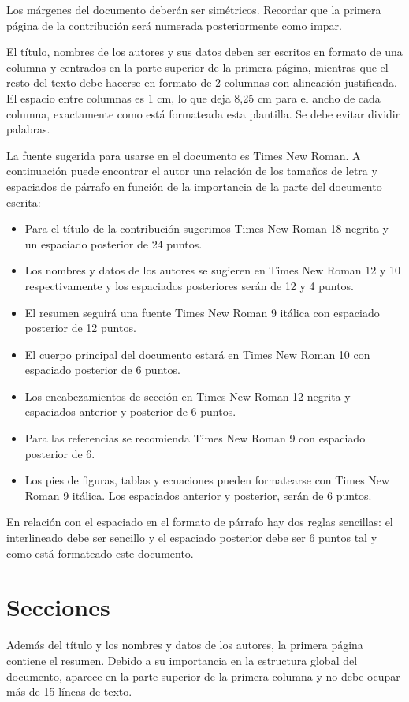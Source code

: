 \documentclass[a4paper,10pt,twocolumn]{article}
\begin{document}
Los márgenes del documento deberán ser simétricos. Recordar que la primera página de la contribución será numerada posteriormente como impar.

El título, nombres de los autores y sus datos deben ser escritos en formato de una columna y centrados en la parte superior de la primera página, mientras que el resto del texto debe hacerse en formato de 2 columnas con alineación justificada. El espacio entre columnas es 1 cm, lo que deja 8,25 cm para el ancho de cada columna, exactamente como está formateada esta plantilla. Se debe evitar dividir palabras.

La fuente sugerida para usarse en el documento es Times New Roman. A continuación puede encontrar el autor una relación de los tamaños de letra y espaciados de párrafo en función de la importancia de la parte del documento escrita:
\begin{itemize}[topsep=0pt, partopsep=0pt, parsep=0pt]
\item Para el título de la contribución sugerimos Times New Roman 18 negrita y un espaciado posterior de 24 puntos.
\item Los nombres y datos de los autores se sugieren en Times New Roman 12 y 10 respectivamente y los espaciados posteriores serán de 12 y 4 puntos.
\item El resumen seguirá una fuente Times New Roman 9 itálica con espaciado posterior de 12 puntos.
\item El cuerpo principal del documento estará en Times New Roman 10 con espaciado posterior de 6 puntos.
\item Los encabezamientos de sección en Times New Roman 12 negrita y espaciados anterior y posterior de 6 puntos.
\item Para las referencias se recomienda Times New Roman 9 con espaciado posterior de 6.
\item Los pies de figuras, tablas y ecuaciones pueden formatearse con Times New Roman 9 itálica. Los espaciados anterior y posterior, serán de 6 puntos.
\end{itemize}

En relación con el espaciado en el formato de párrafo hay dos reglas sencillas: el interlineado debe ser sencillo y el espaciado posterior debe ser 6 puntos tal y como está formateado este documento.

\section{Secciones}
Además del título y los nombres y datos de los autores, la primera página contiene el resumen. Debido a su importancia en la estructura global del documento, aparece en la parte superior de la primera columna y no debe ocupar más de 15 líneas de texto.
\end{document}
